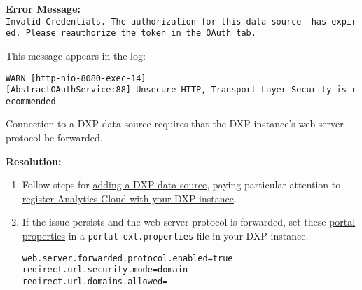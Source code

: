 \textbf{Error Message:}
\texttt{Invalid\ Credentials.\ The\ authorization\ for\ this\ data\ source\ \ has\ expired.\ Please\ reauthorize\ the\ token\ in\ the\ OAuth\ tab.}

This message appears in the log:

\texttt{WARN\ {[}http-nio-8080-exec-14{]}{[}AbstractOAuthService:88{]}\ Unsecure\ HTTP,\ Transport\ Layer\ Security\ is\ recommended}

Connection to a DXP data source requires that the DXP instance's web
server protocol be forwarded.

\textbf{Resolution:}

\begin{enumerate}
\def\labelenumi{\arabic{enumi}.}
\item
  Follow steps for
  \href{https://github.com/liferay/liferay-docs/blob/7.1.x/discover/analytics-cloud/articles/02-getting-started/02-adding-a-liferay-dxp-data-source.markdown}{adding
  a DXP data source}, paying particular attention to
  \href{https://github.com/liferay/liferay-docs/blob/7.1.x/discover/analytics-cloud/articles/02-getting-started/02-adding-a-liferay-dxp-data-source.markdown\#step-2-register-analytics-cloud-with-your-liferay-dxp-instance}{register
  Analytics Cloud with your DXP instance}.
\item
  If the issue persists and the web server protocol is forwarded, set
  these
  \href{https://docs.liferay.com/dxp/portal/7.1-latest/propertiesdoc/portal.properties.html}{portal
  properties} in a \texttt{portal-ext.properties} file in your DXP
  instance.

\begin{verbatim}
web.server.forwarded.protocol.enabled=true
redirect.url.security.mode=domain
redirect.url.domains.allowed=
\end{verbatim}
\end{enumerate}
